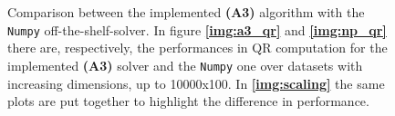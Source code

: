 \begin{figure}[H]
	\begin{subfigure}{.45\textwidth}
	    \centering
	\end{subfigure}
    
	\caption{Comparison between the implemented \textbf{(A3)} algorithm with the \texttt{Numpy} off-the-shelf-solver. In figure \textbf{\ref{img:a3_qr}} and \textbf{\ref{img:np_qr}} there are, respectively, the performances in QR computation for the implemented \textbf{(A3)} solver and the \texttt{Numpy} one over datasets with increasing dimensions, up to 10000x100. In \textbf{\ref{img:scaling}} the same plots are put together to highlight the difference in performance.}
	\label{fig:scaling_qr}
\end{figure}

